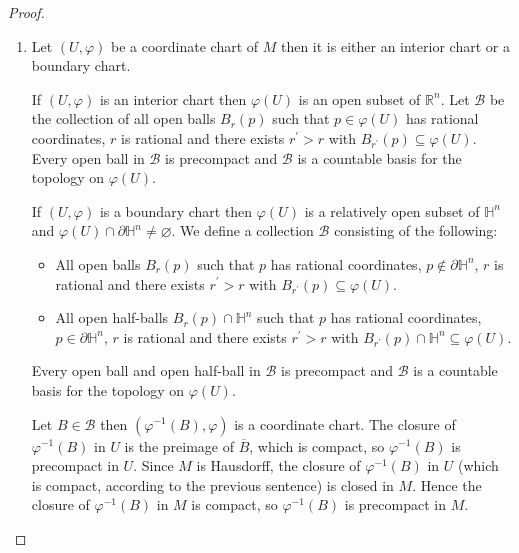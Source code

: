 \begin{proof}
    \begin{enumerate}[itemsep=0pt,label={(\alph*)}]
        \item Let \( (U, \varphi) \) be a coordinate chart of \( M \) then it is either an interior chart or a boundary chart.

              If \( (U, \varphi) \) is an interior chart then \( \varphi(U) \) is an open subset of \( \mathbb{R}^{n} \). Let \( \mathcal{B} \) be the collection of all open balls \( B_{r}(p) \) such that \( p \in \varphi(U) \) has rational coordinates, \( r \) is rational and there exists \( r^{\prime} > r \) with \( B_{r^{\prime}}(p) \subseteq \varphi(U) \). Every open ball in \( \mathcal{B} \) is precompact and \( \mathcal{B} \) is a countable basis for the topology on \( \varphi(U) \).

              If \( (U, \varphi) \) is a boundary chart then \( \varphi(U) \) is a relatively open subset of \( \mathbb{H}^{n} \) and \( \varphi(U) \cap \partial \mathbb{H}^{n} \ne \varnothing \). We define a collection \( \mathcal{B} \) consisting of the following:
              \begin{itemize}[itemsep=0pt]
                  \item All open balls \( B_{r}(p) \) such that \( p \) has rational coordinates, \( p \notin \partial \mathbb{H}^{n} \), \( r \) is rational and there exists \( r^{\prime} > r \) with \( B_{r^{\prime}}(p) \subseteq \varphi(U) \).
                  \item All open half-balls \( B_{r}(p) \cap \mathbb{H}^{n} \) such that  \( p \) has rational coordinates, \( p \in \partial \mathbb{H}^{n} \), \( r \) is rational and there exists \( r^{\prime} > r \) with \( B_{r^{\prime}}(p) \cap \mathbb{H}^{n} \subseteq \varphi(U) \).
              \end{itemize}

              Every open ball and open half-ball in \( \mathcal{B} \) is precompact and \( \mathcal{B} \) is a countable basis for the topology on \( \varphi(U) \).

              Let \( B \in \mathcal{B} \) then \( (\varphi^{-1}(B), \varphi) \) is a coordinate chart. The closure of \( \varphi^{-1}(B) \) in \( U \) is the preimage of \( \overline{B} \), which is compact, so \( \varphi^{-1}(B) \) is precompact in \( U \). Since \( M \) is Hausdorff, the closure of \( \varphi^{-1}(B) \) in \( U \) (which is compact, according to the previous sentence) is closed in \( M \). Hence the closure of \( \varphi^{-1}(B) \) in \( M \) is compact, so \( \varphi^{-1}(B) \) is precompact in \( M \).


\end{enumerate}
\end{proof}
